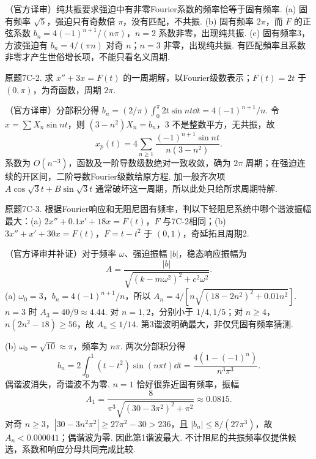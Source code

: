 \begin{solution}（官方译审）纯共振要求强迫中有非零Fourier系数的频率恰等于固有频率. (a) 固有频率 $\sqrt5$，强迫只有奇数倍 $\pi$，没有匹配，不共振. (b) 固有频率 $2\pi$，而 $F$ 的正弦系数 $b_n=4(-1)^{n+1}/(n\pi)$，$n=2$ 系数非零，出现纯共振. (c) 固有频率3，方波强迫有 $b_n=4/(\pi n)$ 对奇 $n$；$n=3$ 非零，出现纯共振. 有匹配頻率且系数非零才产生世俗增长项，不能只看名义周期.\end{solution}
\begin{exercise}\label{cw:bank-7C-2}原题7C-2. 求 $x''+3x=F(t)$ 的一周期解，以Fourier级数表示；$F(t)=2t$ 于 $(0,\pi)$，为奇函数，周期 $2\pi$.\end{exercise}
\begin{solution}（官方译审）分部积分得 $b_n=(2/\pi)\int_0^\pi2t\sin nt\dd t=4(-1)^{n+1}/n$. 令 $x=\sum X_n\sin nt$，则 $(3-n^2)X_n=b_n$，$3$ 不是整数平方，无共振，故
\[x_p(t)=4\sum_{n\ge1}\frac{(-1)^{n+1}\sin nt}{n(3-n^2)}.
\]
系数为 $O(n^{-3})$，函数及一阶导数级数绝对一致收敛，确为 $2\pi$ 周期；在强迫连续的开区间，二阶导数Fourier级数给原方程. 加一般齐次项 $A\cos\sqrt3t+B\sin\sqrt3t$ 通常破坏这一周期，所以此处只给所求周期特解.\end{solution}
\begin{exercise}\label{cw:bank-7C-3}原题7C-3. 根据Fourier响应和无阻尼固有频率，判以下轻阻尼系统中哪个谐波振幅最大：(a) $2x''+0.1x'+18x=F(t)$，$F$ 与7C-2相同；(b) $3x''+x'+30x=F(t)$，$F=t-t^2$ 于 $(0,1)$，奇延拓且周期2.\end{exercise}
\begin{solution}（官方译审并补证）对于频率 $\omega$、强迫振幅 $|b|$，稳态响应振幅为
\[A=\frac{|b|}{\sqrt{(k-m\omega^2)^2+c^2\omega^2}}.
\]
(a) $\omega_0=3$，$b_n=4(-1)^{n+1}/n$，所以 $A_n=4/[n\sqrt{(18-2n^2)^2+0.01n^2}]$. $n=3$ 时 $A_3=40/9\approx4.44$. 对 $n=1,2$，分别小于 $1/4,1/5$；对 $n\ge4$，$n(2n^2-18)\ge56$，故 $A_n\le1/14$. 第3谐波明确最大，非仅凭固有频率猜测.

(b) $\omega_0=\sqrt{10}\approx\pi$，频率为 $n\pi$. 两次分部积分得
\[b_n=2\int_0^1(t-t^2)\sin(n\pi t)\dd t=\frac{4(1-(-1)^n)}{n^3\pi^3}.
\]
偶谐波消失，奇谐波不为零. $n=1$ 恰好很靠近固有频率，振幅
\[A_1=\frac8{\pi^3\sqrt{(30-3\pi^2)^2+\pi^2}}\approx0.0815.
\]
对奇 $n\ge3$，$|30-3n^2\pi^2|\ge27\pi^2-30>236$，且 $|b_n|\le8/(27\pi^3)$，故 $A_n<0.000041$；偶谐波为零. 因此第1谐波最大. 不计阻尼的共振频率仅提供候选，系数和响应分母共同完成比较.\end{solution}
